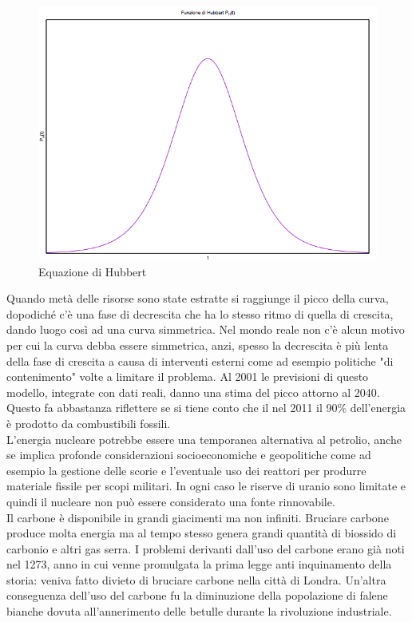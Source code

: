 \documentclass{article}
\numberwithin{figure}{section}
\numberwithin{equation}{section}
\begin{document}
\begin{figure}[h!]
    \centering
    \includegraphics[scale=.4]{hub.png}
    \caption{Equazione di Hubbert}
    \label{fig:hub}
\end{figure}
Quando metà delle risorse sono state estratte si raggiunge il picco della curva, dopodiché c'è una fase di decrescita che ha lo stesso ritmo di quella di crescita, dando luogo così ad una curva simmetrica. Nel mondo reale non c'è alcun motivo per cui la curva debba essere simmetrica, anzi, spesso la decrescita è più lenta della fase di crescita a causa di interventi esterni come ad esempio politiche "di contenimento" volte a limitare il problema.
Al 2001 le previsioni di questo modello, integrate con dati reali, danno una stima del picco attorno al 2040. Questo fa abbastanza riflettere se si tiene conto che il nel 2011 il 90\% dell'energia è prodotto da combustibili fossili.\\

L'energia nucleare potrebbe essere una temporanea alternativa al petrolio, anche se implica profonde considerazioni socioeconomiche e geopolitiche come ad esempio la gestione delle scorie e l'eventuale uso dei reattori per produrre materiale fissile per scopi militari. In ogni caso le riserve di uranio sono limitate e quindi il nucleare non può essere considerato una fonte rinnovabile.\\

Il carbone è disponibile in grandi giacimenti ma non infiniti. Bruciare carbone produce molta energia ma al tempo stesso genera grandi quantità di biossido di carbonio e altri gas serra. I problemi derivanti dall'uso del carbone erano già noti nel 1273, anno in cui venne promulgata la prima legge anti inquinamento della storia: veniva fatto divieto di bruciare carbone nella città di Londra. Un'altra conseguenza dell'uso del carbone fu la diminuzione della popolazione di falene bianche dovuta all'annerimento delle betulle durante la rivoluzione industriale.\\
\end{document}
